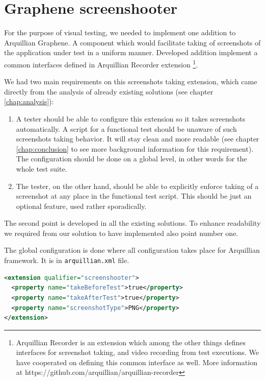 \documentclass[11pt,oneside,final]{fithesis2}
\begin{document}
\section{Graphene screenshooter}
For the purpose of visual testing, we needed to implement one addition to Arquillian Graphene. 
A component which would facilitate taking of screenshots of the application under test in a uniform manner.
Developed addition implement a common interfaces defined in Arquillian Recorder extension
\footnote{Arquillian Recorder is an extension which among the other things defines interfaces 
for screenshot taking, and video recording from test executions. We have cooperated on defining this
common interface as well. More information at https://github.com/arquillian/arquillian-recorder}.

We had two main requirements on this screenshots taking extension, which came directly from the analysis of
already existing solutions (see chapter \ref{chap:analysis}):

\begin{enumerate}
 \item A tester should be able to configure this extension so it takes screenshots automatically. A script
 for a functional test should be unaware of such screenshots taking behavior. It will stay clean and more 
 readable (see chapter \ref{chap:conclusion} to see more background information for this requirement).
 The configuration should be done on a global level, in other words for the whole test suite.
 \item The tester, on the other hand, should be able to explicitly enforce taking of a screenshot at any place
 in the functional test script. This should be just an optional feature, used rather sporadically.
\end{enumerate}

The second point is developed in all the existing solutions. To enhance readability we required from our solution
to have implemented also point number one.

The global configuration is done where all configuration takes place for Arquillian framework. 
It is in \texttt{arquillian.xml} file.

\begin{lstlisting}[caption=Example of screenshooter configuration in arquillian.xml,label=lis:screenshooterconf,language=xml]
<extension qualifier="screenshooter">
  <property name="takeBeforeTest">true</property>
  <property name="takeAfterTest">true</property>
  <property name="screenshotType">PNG</property>
</extension>
\end{lstlisting}
\end{document}
